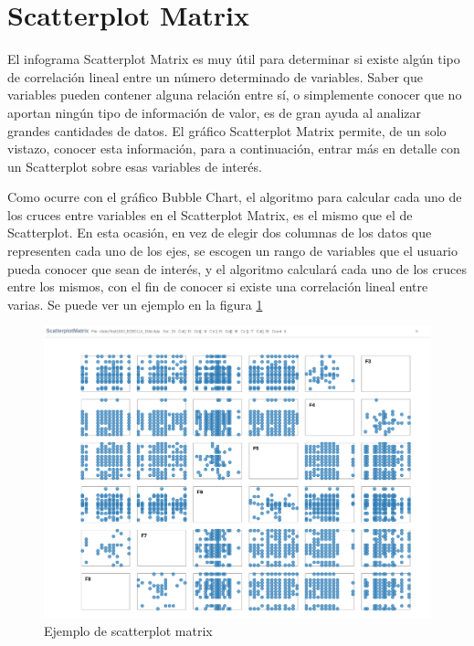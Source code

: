 
\section{Scatterplot Matrix}
El infograma Scatterplot Matrix es muy útil para determinar si existe algún tipo de correlación lineal entre un número determinado de variables. Saber que variables pueden contener alguna relación entre sí, o simplemente conocer que no aportan ningún tipo de información de valor, es de gran ayuda al analizar grandes cantidades de datos. El gráfico Scatterplot Matrix permite, de un solo vistazo, conocer esta información, para a continuación, entrar más en detalle con un Scatterplot sobre esas variables de interés.

Como ocurre con el gráfico Bubble Chart, el algoritmo para calcular cada uno de los cruces entre variables en el Scatterplot Matrix, es el mismo que el de Scatterplot. En esta ocasión, en vez de elegir dos columnas de los datos que representen cada uno de los ejes, se escogen un rango de variables que el usuario pueda conocer que sean de interés, y el algoritmo calculará cada uno de los cruces entre los mismos, con el fin de conocer si existe una correlación lineal entre varias. Se puede ver un ejemplo en la figura \ref{fig:ejemploscatterplotmatrix}
\begin{figure}
	\centering
	\includegraphics[width=1\linewidth]{imagenes/ejemplo_scatterplotMatrix}
	\caption{Ejemplo de scatterplot matrix}
	\label{fig:ejemploscatterplotmatrix}
\end{figure}

